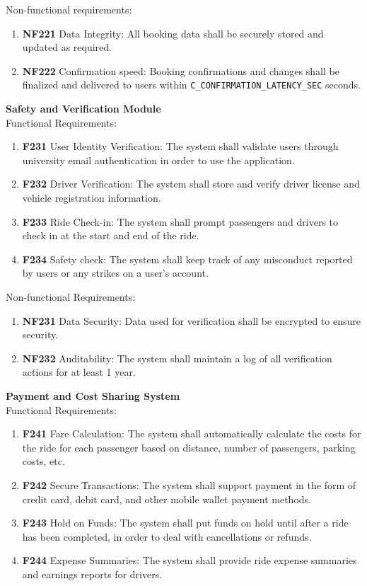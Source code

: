 \documentclass[12pt,letterpaper]{article}
\begin{document}
Non-functional requirements:
\begin{enumerate}
  \item \textbf{NF221} Data Integrity: All booking data shall be securely stored and updated as required.
  \item \textbf{NF222} Confirmation speed: Booking confirmations and changes shall be finalized and delivered to users within \texttt{C\_CONFIRMATION\_LATENCY\_SEC} seconds.
\end{enumerate}
\vspace{1em}
\noindent \textbf{Safety and Verification Module} \\
Functional Requirements:
\begin{enumerate}
  \item \textbf{F231} User Identity Verification: The system shall validate users through university email authentication in order to use the application.
  \item \textbf{F232} Driver Verification: The system shall store and verify driver license and vehicle registration information.
  \item \textbf{F233} Ride Check-in: The system shall prompt passengers and drivers to check in at the start and end of the ride.
  \item \textbf{F234} Safety check: The system shall keep track of any misconduct reported by users or any strikes on a user’s account.
\end{enumerate}
Non-functional Requirements:
\begin{enumerate}
  \item \textbf{NF231} Data Security: Data used for verification shall be encrypted to ensure security.
  \item \textbf{NF232} Auditability: The system shall maintain a log of all verification actions for at least 1 year.
\end{enumerate}
\vspace{1em}
\noindent \textbf{Payment and Cost Sharing System} \\
Functional Requirements:
\begin{enumerate}
  \item \textbf{F241} Fare Calculation: The system shall automatically calculate the costs for the ride for each passenger based on distance, number of passengers, parking costs, etc.
  \item \textbf{F242} Secure Transactions: The system shall support payment in the form of credit card, debit card, and other mobile wallet payment methods.
  \item \textbf{F243} Hold on Funds: The system shall put funds on hold until after a ride has been completed, in order to deal with cancellations or refunds.
  \item \textbf{F244} Expense Summaries: The system shall provide ride expense summaries and earnings reports for drivers.
\end{enumerate}
\end{document}

